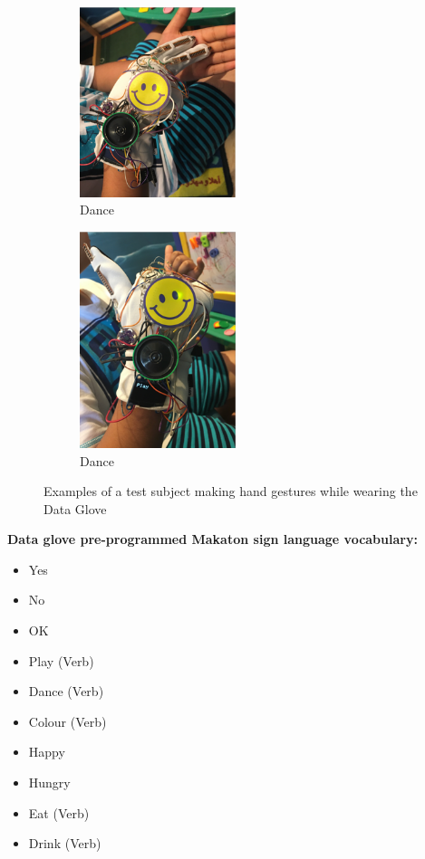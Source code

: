 \begin{figure}
  \begin{subfigure}
    \centering
    \includegraphics[width=0.5\textwidth]{./assets/img/Dance}
    \caption{Dance}
    \label{fig:dance}
  \end{subfigure}
  \begin{subfigure}
    \centering
    \includegraphics[width=0.5\textwidth]{./assets/img/Play}
    \caption{Dance}
    \label{fig:play}
  \end{subfigure}
  \caption{Examples of a test subject making hand gestures while wearing the Data Glove}
  \label{fig:examplegestures}
\end{figure}

\textbf{Data glove pre-programmed Makaton sign language vocabulary:}

\begin{itemize}
  \item Yes
  \item No
  \item OK
  \item Play (Verb)
  \item Dance (Verb)
  \item Colour (Verb)
  \item Happy
  \item Hungry
  \item Eat (Verb)
  \item Drink (Verb)
\end{itemize}

